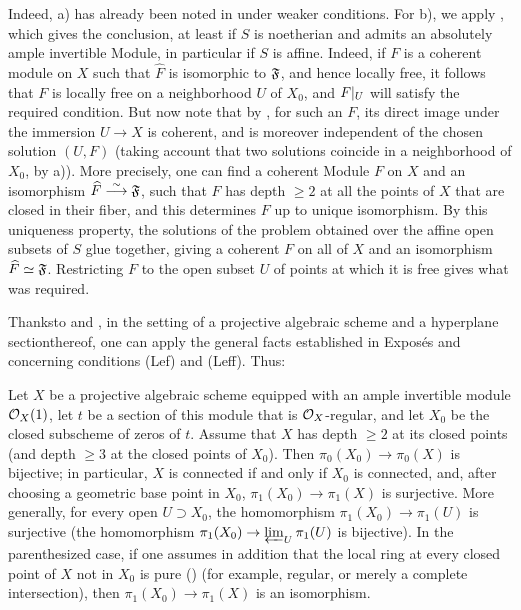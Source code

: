 Indeed, a) has already been noted in  under weaker conditions. For b), we apply , which gives the conclusion, at least if $S$ is noetherian and admits an absolutely ample invertible Module, in particular if $S$ is affine. Indeed, if $F$ is a coherent module on $X$ such that $\widehat{F}$ is isomorphic to $\formelF$, and hence locally free, it follows that $F$ is locally free on a neighborhood $U$ of $X_0$, and $\sisi{F|U}{F|_U}$ will satisfy the required condition. But now note that by , for such an $F$, its direct image under the immersion $U\to X$ is coherent, and is moreover independent of the chosen solution $(U, F)$ (taking account  that two solutions coincide in a neighborhood of $X_0$, by a)). More precisely, one can find a coherent Module $F$ on $X$ and an isomorphism $\widehat{F}\isomto \formelF$, such that $F$ has depth $\geq 2$ at all the points of $X$ that are closed in their fiber, and this determines $F$ up to unique isomorphism. By this uniqueness property, the solutions of the problem obtained over the affine open subsets of $S$ glue together, giving a coherent $F$ on all of $X$ and an isomorphism $\widehat{F}\simeq \formelF$. Restricting $F$ to the open subset $U$ of points at which it is free gives what was required.

Thanks\pageoriginale to  and , in the setting of a projective algebraic scheme and a \og hyperplane section\fg thereof, one can apply the general facts established in Expos\'es  and  concerning conditions (Lef) and (Leff). Thus:

\begin{corollaire} \label{XII.3.5} Let $X$ be a projective algebraic scheme equipped with an ample invertible module $\OX(1)$, let $t$ be a section of this module that is $\OX$-regular, and let $X_0$ be the closed subscheme of zeros of $t$. Assume that $X$ has depth $\geq 2$ at its closed points (\resp and depth $\geq 3$ at the closed points of $X_0$). Then $\pi_0(X_0)\to \pi_0(X)$ is bijective; in particular, $X$ is connected if and only if $X_0$ is connected, and, after choosing a geometric base point in $X_0$, $\pi_1(X_0)\to \pi_1(X)$ is surjective. More generally, for every open $U\supset X_0$, the homomorphism $\pi_1(X_0)\to \pi_1(U)$ is surjective (\resp the homomorphism $\pi_1(X_0)\to \varprojlim_U\pi_1(U)$ is bijective). In the parenthesized case, if one assumes in addition that the local ring at every closed point of $X$ not in $X_0$ is pure () (for example, regular, or merely a complete intersection), then $\pi_1(X_0)\to \pi_1(X)$ is an isomorphism.
\end{corollaire}

